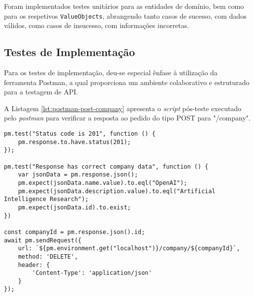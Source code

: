 Foram implementados testes unitários para as entidades de domínio, bem como para os respetivos \lstinline|ValueObjects|, abrangendo tanto casos de sucesso, com dados válidos, como casos de insucesso, com informações incorretas.

\subsection{Testes de Implementação}

Para os testes de implementação, deu-se especial ênfase à utilização da ferramenta Postman, a qual proporciona um ambiente colaborativo e estruturado para a testagem de \gls{API}.

A Listagem \ref{lst:postman-post-company} apresenta o \textit{script} pós-teste executado pelo \textit{postman} para verificar a resposta ao pedido do tipo POST para "/company". 

\begin{lstlisting}[style=Javascript, label={lst:postman-post-company}, caption={Script de test da rota POST /company}]
pm.test("Status code is 201", function () {
    pm.response.to.have.status(201);
});

pm.test("Response has correct company data", function () {
    var jsonData = pm.response.json();
    pm.expect(jsonData.name.value).to.eql("OpenAI");
    pm.expect(jsonData.description.value).to.eql("Artificial Intelligence Research");
    pm.expect(jsonData.id).to.exist;
})

const companyId = pm.response.json().id;
await pm.sendRequest({
    url: `${pm.environment.get("localhost")}/company/${companyId}`,
    method: 'DELETE',
    header: {
        'Content-Type': 'application/json'
    }
});
\end{lstlisting}

